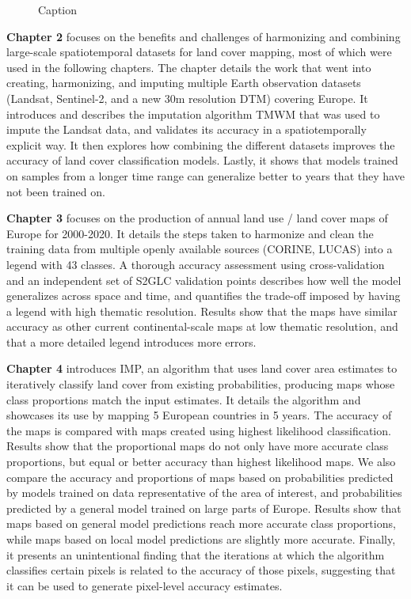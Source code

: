\begin{figure}
    \centering
    \caption{Caption}
    \label{fig:01_conceptual_framework}
\end{figure}


\textbf{Chapter 2} focuses on the benefits and challenges of harmonizing and combining large-scale spatiotemporal datasets for land cover mapping, most of which were used in the following chapters. The chapter details the work that went into creating, harmonizing, and imputing multiple Earth observation datasets (Landsat, Sentinel-2, and a new 30m resolution DTM) covering Europe. It introduces and describes the imputation algorithm TMWM that was used to impute the Landsat data, and validates its accuracy in a spatiotemporally explicit way. It then explores how combining the different datasets improves the accuracy of land cover classification models. Lastly, it shows that models trained on samples from a longer time range can generalize better to years that they have not been trained on.


\textbf{Chapter 3} focuses on the production of annual land use / land cover maps of Europe for 2000-2020. It details the steps taken to harmonize and clean the training data from multiple openly available sources (CORINE, LUCAS) into a legend with 43 classes. A thorough accuracy assessment using cross-validation and an independent set of S2GLC validation points describes how well the model generalizes across space and time, and quantifies the trade-off imposed by having a legend with high thematic resolution. Results show that the maps have similar accuracy as other current continental-scale maps at low thematic resolution, and that a more detailed legend introduces more errors.


\textbf{Chapter 4} introduces IMP, an algorithm that uses land cover area estimates to iteratively classify land cover from existing probabilities, producing maps whose class proportions match the input estimates. It details the algorithm and showcases its use by mapping 5 European countries in 5 years. The accuracy of the maps is compared with maps created using highest likelihood classification. Results show that the proportional maps do not only have more accurate class proportions, but equal or better accuracy than highest likelihood maps. We also compare the accuracy and proportions of maps based on probabilities predicted by models trained on data representative of the area of interest, and probabilities predicted by a general model trained on large parts of Europe. Results show that maps based on general model predictions reach more accurate class proportions, while maps based on local model predictions are slightly more accurate. Finally, it presents an unintentional finding that the iterations at which the algorithm classifies certain pixels is related to the accuracy of those pixels, suggesting that it can be used to generate pixel-level accuracy estimates.

